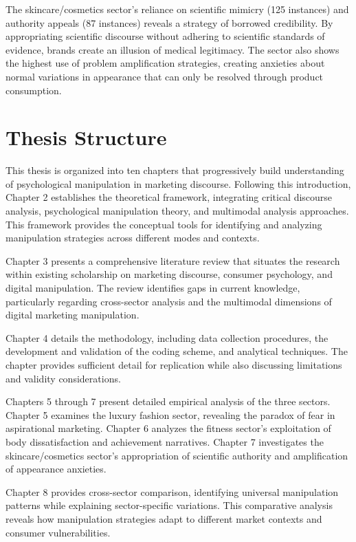 The skincare/cosmetics sector's reliance on scientific mimicry (125 instances) and authority appeals (87 instances) reveals a strategy of borrowed credibility. By appropriating scientific discourse without adhering to scientific standards of evidence, brands create an illusion of medical legitimacy. The sector also shows the highest use of problem amplification strategies, creating anxieties about normal variations in appearance that can only be resolved through product consumption.

\section{Thesis Structure}
\label{sec:thesis_structure}

This thesis is organized into ten chapters that progressively build understanding of psychological manipulation in marketing discourse. Following this introduction, Chapter 2 establishes the theoretical framework, integrating critical discourse analysis, psychological manipulation theory, and multimodal analysis approaches. This framework provides the conceptual tools for identifying and analyzing manipulation strategies across different modes and contexts.

Chapter 3 presents a comprehensive literature review that situates the research within existing scholarship on marketing discourse, consumer psychology, and digital manipulation. The review identifies gaps in current knowledge, particularly regarding cross-sector analysis and the multimodal dimensions of digital marketing manipulation.

Chapter 4 details the methodology, including data collection procedures, the development and validation of the coding scheme, and analytical techniques. The chapter provides sufficient detail for replication while also discussing limitations and validity considerations.

Chapters 5 through 7 present detailed empirical analysis of the three sectors. Chapter 5 examines the luxury fashion sector, revealing the paradox of fear in aspirational marketing. Chapter 6 analyzes the fitness sector's exploitation of body dissatisfaction and achievement narratives. Chapter 7 investigates the skincare/cosmetics sector's appropriation of scientific authority and amplification of appearance anxieties.

Chapter 8 provides cross-sector comparison, identifying universal manipulation patterns while explaining sector-specific variations. This comparative analysis reveals how manipulation strategies adapt to different market contexts and consumer vulnerabilities.

